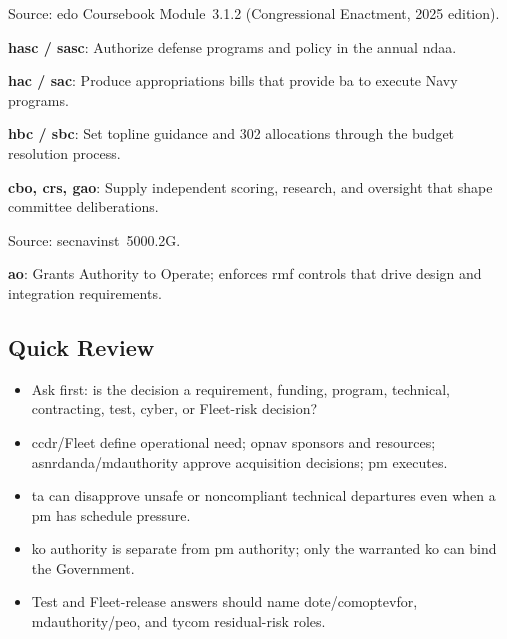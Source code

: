 \documentclass[../main.tex]{subfiles}
\begin{document}
\begin{description}[style=nextline, labelsep=0.5em, font=\bfseries]
  \item[\textbf{Congressional resource chain.}]
        Source: \ac{edo} Coursebook Module~3.1.2 (Congressional Enactment, 2025 edition).
        \begin{description}
          \item \textbf{\ac{hasc} / \ac{sasc}}: Authorize defense programs and policy in the annual \ac{ndaa}.
          \item \textbf{\ac{hac} / \ac{sac}}: Produce appropriations bills that provide \ac{ba} to execute Navy programs.
          \item \textbf{\ac{hbc} / \ac{sbc}}: Set topline guidance and 302 allocations through the budget resolution process.
          \item \textbf{\ac{cbo}, \ac{crs}, \ac{gao}}: Supply independent scoring, research, and oversight that shape committee deliberations.
        \end{description}

  \item[\textbf{Cyber/Authorizations (when IT/C2 in scope).}]
        Source: \ac{secnavinst}~5000.2G.
        \begin{description}
          \item \textbf{\ac{ao}}: Grants Authority to Operate; enforces \ac{rmf} controls that drive design and integration requirements.
        \end{description}
\end{description}

\subsection{Quick Review}
\begin{itemize}
  \item Ask first: is the decision a requirement, funding, program, technical, contracting, test, cyber, or Fleet-risk decision?
  \item \ac{ccdr}/Fleet define operational need; \ac{opnav} sponsors and resources; \ac{asnrdanda}/\ac{mdauthority} approve acquisition decisions; \ac{pm} executes.
  \item \ac{ta} can disapprove unsafe or noncompliant technical departures even when a \ac{pm} has schedule pressure.
  \item \ac{ko} authority is separate from \ac{pm} authority; only the warranted \ac{ko} can bind the Government.
  \item Test and Fleet-release answers should name \ac{dote}/\ac{comoptevfor}, \ac{mdauthority}/\ac{peo}, and \ac{tycom} residual-risk roles.
\end{itemize}
\end{document}
